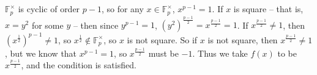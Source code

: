 \documentclass[11pt]{article}
\def\F{\mathbb{F}}
\begin{document}
\section{} %
\subsection{} %
$\F_p^\times$ is cyclic of order $p-1$, so for any $x\in\F_p^\times$, $x^{p-1}=1$.
If $x$ is square -- that is, $x=y^2$ for some $y$ -- then since $y^{p-1}=1$, $(y^2)^\frac{p-1}{2}=x^\frac{p-1}{2}=1$.
If $x^\frac{p-1}{2}\neq1$, then $(x^\frac{1}{2})^{p-1}\neq1$, so $x^\frac{1}{2}\not\in\F_p^\times$, so $x$ is not square.
So if $x$ is not square, then $x^\frac{p-1}{2}\neq1$, but we know that $x^{p-1}=1$, so $x^\frac{p-1}{2}$ must be $-1$.
Thus we take $f(x)$ to be $x^\frac{p-1}{2}$, and the condition is satisfied.
\end{document}
